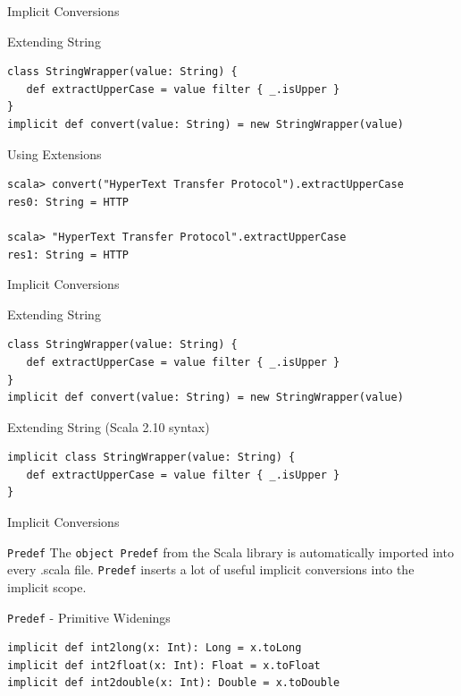 \begin{frame}[fragile]{Implicit Conversions}
\begin{exampleblock}{Extending String}
\begin{lstlisting}
class StringWrapper(value: String) {
   def extractUpperCase = value filter { _.isUpper }
}
implicit def convert(value: String) = new StringWrapper(value)
\end{lstlisting}
\end{exampleblock}
\begin{exampleblock}{Using Extensions}
\begin{lstlisting}
scala> convert("HyperText Transfer Protocol").extractUpperCase
res0: String = HTTP

scala> "HyperText Transfer Protocol".extractUpperCase
res1: String = HTTP
\end{lstlisting}
\end{exampleblock}
\end{frame}

\begin{frame}[fragile]{Implicit Conversions}
\begin{exampleblock}{Extending String}
\begin{lstlisting}
class StringWrapper(value: String) {
   def extractUpperCase = value filter { _.isUpper }
}
implicit def convert(value: String) = new StringWrapper(value)
\end{lstlisting}
\end{exampleblock}
\begin{exampleblock}{Extending String (Scala 2.10 syntax)}
\begin{lstlisting}
implicit class StringWrapper(value: String) {
   def extractUpperCase = value filter { _.isUpper }
}
\end{lstlisting}
\end{exampleblock}
\end{frame}

\begin{frame}[fragile]{Implicit Conversions}
\begin{block}{\lstinline!Predef!}
The \lstinline!object Predef! from the Scala library is automatically imported
into every .scala file. \lstinline!Predef! inserts a lot of useful implicit
conversions into the implicit scope.
\end{block}
\begin{exampleblock}{\lstinline!Predef! - Primitive Widenings}
\begin{lstlisting}
implicit def int2long(x: Int): Long = x.toLong
implicit def int2float(x: Int): Float = x.toFloat
implicit def int2double(x: Int): Double = x.toDouble
\end{lstlisting}
\end{exampleblock}
\end{frame}

